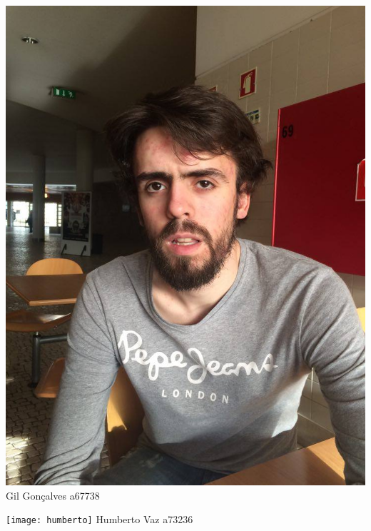 \begin{titlepage}
\begin{center}
\begin{minipage}[b]{.1\textwidth}
	\includegraphics[scale=0.1]{gil}
	\small{Gil Gonçalves a67738}
\end{minipage}
\hfill
\begin{minipage}[b]{.1\textwidth}
	\texttt{[image: humberto]}
	\small{Humberto Vaz a73236 }
\end{minipage} 
\hfill

\end{center}
\end{titlepage}
